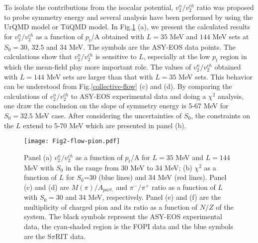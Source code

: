 \documentclass[reprint,aps,prc,twocolumn,superscriptaddress]{revtex4-1}
\begin{document}




To isolate the contributions from the isocalar potential, $v_2^n/v_2^{ch}$ ratio was proposed to probe symmetry energy and several analysis have been performed by using the UrQMD model or T\"uQMD model\cite{Russotto2016PRC,Cozma2016PLB}. In Fig.\ref{flow-pion} (a), we present the calculated results for $v_2^n/v_2^{ch}$ as a function of $p_t$/A obtained with $L=35$ MeV and $144$ MeV sets at $S_0=30$, $32.5$ and $34$ MeV. The symbols are the ASY-EOS data points. %
The calculations show that $v_2^n/v_2^{ch}$ is sensitive to $L$, especially at the low $p_t$ region in which the mean-field play more important role. The values of $v_2^n/v_2^{ch}$ obtained with $L=144$ MeV sets are larger than that with $L=35$ MeV sets. This behavior can be understood from Fig.\ref{collective-flow} (c) and (d). By comparing the calculations of $v_2^n/v_2^{ch}$ to ASY-EOS experimental data and doing a $\chi^2$ analysis, one draw the conclusion on the slope of symmetry energy is 5-67 MeV for $S_0=32.5$ MeV case. After considering the uncertainties of $S_0$, the constraints on the $L$ extend to 5-70 MeV which are presented in panel (b). %
\begin{figure}[htbp]
	\centering
	\texttt{[image: Fig2-flow-pion.pdf]}
	\setlength{\abovecaptionskip}{0pt}
	\vspace{2em}
	\caption{Panel (a) $v_2^n/v_2^{ch}$ as a function of $p_t$/A for $L=35$ MeV and $L=144$ MeV with $S_0$ in the range from 30 MeV to 34 MeV; (b) $\chi^2$ as a function of $L$ for $S_0$=30 (blue lines) and 34 MeV (red lines). Panel (c) and (d) are $M(\pi)/A_{part.}$ and $\pi^-/\pi^+$ ratio as a function of $L$ with $S_0=30$ and $34$ MeV, respectively. Panel (e) and (f) are the multiplicity of charged pion and its ratio as a function of $N/Z$ of the system. The black symbols represent the ASY-EOS experimental data\cite{Russotto2016PRC},  the cyan-shaded region is the FOPI data and the blue symbols are the S$\pi$RIT data.} 
	\setlength{\belowcaptionskip}{0pt}
	\label{flow-pion}
\end{figure}
\end{document}
